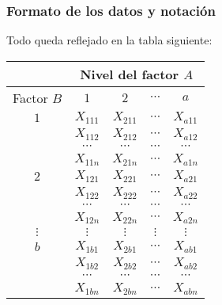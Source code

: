 \begin{frame}
\frametitle{Formato de los datos y notación}
{Todo queda reflejado en la tabla siguiente:} 
{\small\begin{center}
\begin{tabular}{ccccc}
\hline
&\multicolumn{4}{c}{Nivel del factor $A$}\\\hline
Factor $B$&$1$&$2$&$\cdots$&$a$\\\hline
$1$&$X_{111}$&$X_{211}$&$\cdots$&$X_{a11}$\\
&$X_{112}$&$X_{212}$&$\cdots$&$X_{a12}$\\
&$\cdots$&$\cdots$&$\cdots$&$\cdots$\\
&$X_{11n}$&$X_{21n}$&$\cdots$&$X_{a1n}$\\\hline
$2$&$X_{121}$&$X_{221}$&$\cdots$&$X_{a21}$\\
&$X_{122}$&$X_{222}$&$\cdots$&$X_{a22}$\\
&$\cdots$&$\cdots$&$\cdots$&$\cdots$\\
&$X_{12n}$&$X_{22n}$&$\cdots$&$X_{a2n}$\\\hline
$\vdots$&$\vdots$&$\vdots$&$\vdots$&$\vdots$\\\hline
$b$&$X_{1b1}$&$X_{2b1}$&$\cdots$&$X_{ab1}$\\
&$X_{1b2}$&$X_{2b2}$&$\cdots$&$X_{ab2}$\\
&$\cdots$&$\cdots$&$\cdots$&$\cdots$\\
&$X_{1bn}$&$X_{2bn}$&$\cdots$&$X_{abn}$\\\hline
\end{tabular}
\end{center}}
\end{frame}

